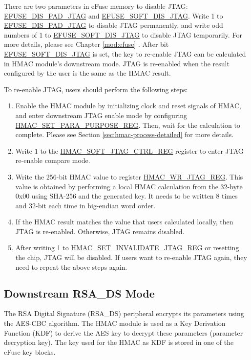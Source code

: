 \documentclass[main\_\_EN.tex]{subfiles}
\begin{document}
There are two parameters in eFuse memory to disable JTAG: \hyperref[fielddesc:EFUSEDISPADJTAG]{EFUSE\_DIS\_PAD\_JTAG} and \hyperref[fielddesc:EFUSESOFTDISJTAG]{EFUSE\_SOFT\_DIS\_JTAG}. Write 1 to \hyperref[fielddesc:EFUSEDISPADJTAG]{EFUSE\_DIS\_PAD\_JTAG} to disable JTAG permanently, and write odd numbers of 1 to \hyperref[fielddesc:EFUSESOFTDISJTAG]{EFUSE\_SOFT\_DIS\_JTAG} to disable JTAG temporarily. For more details, please see Chapter \ref{mod:efuse} \textit{}. After bit \hyperref[fielddesc:EFUSESOFTDISJTAG]{EFUSE\_SOFT\_DIS\_JTAG} is set, the key to re-enable JTAG can be calculated in HMAC module's downstream mode. JTAG is re-enabled when the result configured by the user is the same as the HMAC result.

To re-enable JTAG, users should perform the following steps:

\begin{enumerate}
\item Enable the HMAC module by initializing clock and reset signals of HMAC, and enter downstream JTAG enable mode by configuring \hyperref[regdesc:HMACSETPARAPURPOSEREG]{HMAC\_SET\_PARA\_PURPOSE\_REG}. Then, wait for the calculation to complete. Please see Section \ref{sec:hmac-process-detailed} for more details.
\item Write 1 to the \hyperref[regdesc:HMACSOFTJTAGCTRLREG]{HMAC\_SOFT\_JTAG\_CTRL\_REG} register to enter JTAG re-enable compare mode.
\item Write the 256-bit HMAC value to register \hyperref[regdesc:HMACWRJTAGREG]{HMAC\_WR\_JTAG\_REG}. This value is obtained by performing a local HMAC calculation from the 32-byte 0x00 using SHA-256 and the generated key. It needs to be written 8 times and 32-bit each time in big-endian word order.
\item If the HMAC result matches the value that users calculated locally, then JTAG is re-enabled. Otherwise, JTAG remains disabled.
\item After writing 1 to \hyperref[regdesc:HMACSETINVALIDATEJTAGREG]{HMAC\_SET\_INVALIDATE\_JTAG\_REG} or resetting the chip, JTAG will be disabled. If users want to re-enable JTAG again, they need to repeat the above steps again.
\end{enumerate}

\subsection{Downstream RSA\_DS Mode}

The RSA Digital Signature (RSA\_DS) peripheral encrypts its parameters using the AES-CBC algorithm. The HMAC module is used as a Key Derivation Function (KDF) to derive the AES key to decrypt these parameters (parameter decryption key). The key used for the HMAC as KDF is stored in one of the eFuse key blocks.
\end{document}
